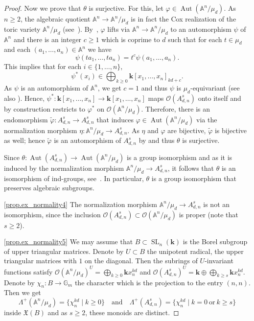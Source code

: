\documentclass[JEP,XML,SOM,Unicode]{cedram}
\let\mathcal\mathscr
\theoremstyle{plain}
\theoremstyle{definition}
\DeclareMathOperator{\SL}{SL}
\DeclareMathOperator{\Aut}{Aut}
\newcommand{\OO}{\mathcal{O}}
\newcommand{\GG}{\mathbb{G}}
\renewcommand{\AA}{\mathbb{A}}
\newcommand{\kk}{{\boldsymbol{k}}}
\newcommand{\set}[2]{\{#1 \mid #2\}}
\begin{document}
\begin{proof}
Now we prove that $\theta$ is surjective. For this, let $\varphi \in \Aut(\AA^n / \mu_d)$.
As $n \geq 2$,
the algebraic quotient $\AA^n \to \AA^n/\mu_d$ is in fact the Cox realization of the toric variety
$\AA^n/\mu_d$ (see~\cite[Th.\,3.1]{ArGa2010Cox-rings-semigrou}).
By~\cite[Cor.\,2.5, Lem.\,4.2]{Be2003Lifting-of-morphis},
$\varphi$ lifts via $\AA^n \to \AA^n / \mu_d$ to an automorphism $\psi$ of $\AA^n$
and there is an integer $c \geq 1$ which is coprime to $d$ such that for each $t \in \mu_d$
and each $(a_1, \ldots, a_n) \in \AA^n$ we have
\[
\psi(t a_1, \ldots, t a_n) = t^c \psi(a_1, \ldots, a_n).
\]
This implies that for each $i \in \{1, \ldots, n\}$,
\[
\psi^\ast(x_i) \in \bigoplus_{k\geq0} \kk[x_1,\dots,x_n]_{kd+c}.
\]
As $\psi$ is an automorphism of $\AA^n$, we get $c = 1$ and thus
$\psi$ is $\mu_d$-equivariant (see also \cite[Prop.\,4]{Re2017Characterization-o}).
Hence, $\psi^\ast \colon \kk[x_1, \ldots,x_n] \to \kk[x_1, \ldots, x_n]$ maps
$\OO(A_{d, n}^s)$ onto itself and by construction restricts to $\varphi^\ast$ on $\OO(\AA^n / \mu_d)$.
Therefore, there is an endomorphism $\tilde{\varphi} \colon A_{d, n}^s \to A_{d, n}^s$
that induces $\varphi \in \Aut(\AA^n / \mu_d)$
via the normalization morphism $\eta \colon \AA^n / \mu_d \to A_{d, n}^s$.
As $\eta$ and $\varphi$ are bijective,
$\tilde{\varphi}$ is bijective as well;
hence $\tilde{\varphi}$ is an automorphism of $A_{d, n}^s$ by \cite[Lem.\,1]{Ka2005On-a-theorem-of-Ax} and thus $\theta$ is surjective.

Since $\theta \colon \Aut(A_{d, n}^s) \to \Aut(\AA^n / \mu_d)$ is a group isomorphism
and as it is induced by the normalization morphism $\AA^n / \mu_d \to A_{d, n}^s$, it follows that $\theta$
is an isomorphism of ind-groups, see~\cite[Prop.\,12.1.1]{FuKr2018On-the-geometry-of}. In particular, $\theta$ is a group isomorphism that
preserves algebraic subgroups.

\eqref{prop.ex_normality4}
The normalization morphism $\AA^n / \mu_d \to A_{d, n}^s$ is
not an isomorphism, since the inclusion $\OO(A_{d, n}^s) \subset \OO(\AA^n / \mu_d)$ is proper
(note that $s \geq 2$).

\eqref{prop.ex_normality5}
We may assume that $B \subset \SL_n(\kk)$ is the Borel subgroup of upper triangular matrices.
Denote by $U \subset B$ the unipotent radical, \ie the upper triangular matrices with $1$ on the diagonal.
Then the subrings of $U$-invariant functions satisfy
$\OO(\AA^n / \mu_d)^U = \bigoplus_{k \geq 0} \kk x_n^{kd}$ and
$\OO(A_{d, n}^s)^U = \kk \oplus \bigoplus_{k \geq s} \kk x_n^{kd}$. Denote by
$\chi_n \colon B \to \GG_m$ the character which is the projection to the entry $(n, n)$.
Then we get
\[
\Lambda^+(\AA^n / \mu_d) = \set{\chi_n^{kd}}{k \geq 0} \quad \textrm{and} \quad
\Lambda^+(A_{d, n}^s) = \set{\chi_n^{kd}}{k = 0 \ \textrm{or} \ k \geq s}
\]
inside $\mathfrak{X}(B)$ and as $s \geq 2$, these monoids are distinct.
\end{proof}

\backmatter


\end{document}
